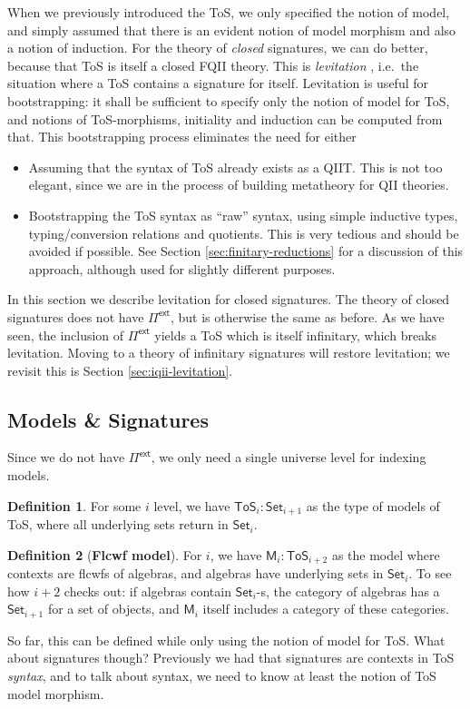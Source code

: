\documentclass[12pt,a4paper,twoside,openany]{book}
\theoremstyle{remark}
\theoremstyle{definition}
\newtheorem{mydefinition}{Definition}
\theoremstyle{theorem}
\newcommand{\bs}[1]{\boldsymbol{#1}}
\newcommand{\Set}{\mathsf{Set}}
\newcommand{\ToS}{\mathsf{ToS}}
\newcommand{\Pie}{\Pi^{\mathsf{ext}}}
\newcommand{\bM}{\bs{\mathsf{M}}}
\begin{document}
When we previously introduced the ToS, we only specified the notion of model,
and simply assumed that there is an evident notion of model morphism and also a
notion of induction. For the theory of \emph{closed} signatures, we can do
better, because that ToS is itself a closed FQII theory. This is
\emph{levitation} \cite{chapman2010gentle}, i.e.\ the situation where a ToS contains a
signature for itself. Levitation is useful for bootstrapping: it shall be
sufficient to specify only the notion of model for ToS, and notions of
ToS-morphisms, initiality and induction can be computed from that. This
bootstrapping process eliminates the need for either
\begin{itemize}
  \item Assuming that the syntax of ToS already exists as a QIIT. This is
        not too elegant, since we are in the process of building metatheory
        for QII theories.
  \item Bootstrapping the ToS syntax as ``raw'' syntax, using simple inductive
        types, typing/conversion relations and quotients. This is very tedious and
        should be avoided if possible. See Section \ref{sec:finitary-reductions} for
        a discussion of this approach, although used for slightly different
        purposes.
\end{itemize}

In this section we describe levitation for closed signatures. The theory of
closed signatures does not have $\Pie$, but is otherwise the same as before.  As
we have seen, the inclusion of $\Pie$ yields a ToS which is itself infinitary,
which breaks levitation. Moving to a theory of infinitary signatures will
restore levitation; we revisit this is Section \ref{sec:iqii-levitation}.

\subsection{Models \& Signatures}

Since we do not have $\Pie$, we only need a single universe level for indexing models.

\begin{mydefinition} For some $i$ level, we have $\ToS_i : \Set_{i+1}$ as the type of
models of ToS, where all underlying sets return in $\Set_i$.
\end{mydefinition}

\begin{mydefinition}[\textbf{Flcwf model}]
For $i$, we have $\bM_{i} : \ToS_{i + 2}$ as the model where contexts are flcwfs
of algebras, and algebras have underlying sets in $\Set_i$. To see how $i + 2$
checks out: if algebras contain $\Set_i$-s, the category of algebras has a
$\Set_{i + 1}$ for a set of objects, and $\bM_{i}$ itself includes a category of
these categories.
\end{mydefinition}
So far, this can be defined while only using the notion of model for ToS. What
about signatures though? Previously we had that signatures are contexts in ToS
\emph{syntax}, and to talk about syntax, we need to know at least the notion of
ToS model morphism.
\end{document}
